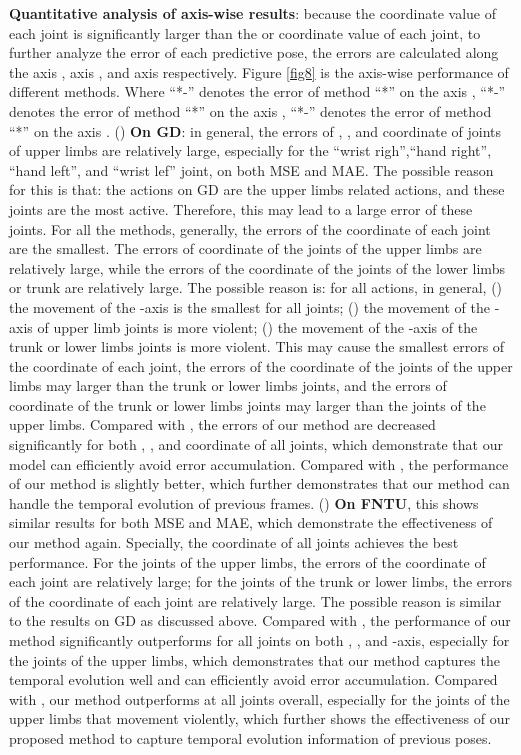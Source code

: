 \documentclass[journal]{IEEEtran}
\begin{document}
{\bf Quantitative analysis of axis-wise results}: because the  coordinate value of each joint is significantly larger than the  or  coordinate value of each joint, to further analyze the error of each predictive pose, the errors are calculated along the axis , axis , and axis  respectively. Figure \ref{fig8} is the axis-wise performance of different methods. Where ``*-'' denotes the error of method ``*'' on the axis , ``*-'' denotes the error of method ``*'' on the axis , ``*-'' denotes the error of method ``*'' on the axis . () {\bf On GD}: in general, the errors of , , and  coordinate of joints of upper limbs are relatively large, especially for the ``wrist righ'',``hand right'', ``hand left'', and ``wrist lef'' joint, on both MSE and MAE. The possible reason for this is that: the actions on GD are the upper limbs related actions, and these joints are the most active. Therefore, this may lead to a large error of these joints. For all the methods, generally, the errors of the  coordinate of each joint are the smallest. The errors of  coordinate of the joints of the upper limbs are relatively large, while the errors of the  coordinate of the joints of the lower limbs or trunk are relatively large. The possible reason is: for all actions, in general, () the movement of the -axis is the smallest for all joints; () the movement of the -axis of upper limb joints is more violent; () the movement of the -axis of the trunk or lower limbs joints is more violent. This may cause the smallest errors of the  coordinate of each joint, the errors of the  coordinate of the joints of the upper limbs may larger than the trunk or lower limbs joints, and the errors of  coordinate of the trunk or lower limbs joints may larger than the joints of the upper limbs. Compared with \cite{predcnn}, the errors of our method are decreased significantly for both , , and  coordinate of all joints, which demonstrate that our model can efficiently avoid error accumulation. Compared with \cite{ButepageDRL}, the performance of our method is slightly better, which further demonstrates that our method can handle the temporal evolution of previous frames. () {\bf On FNTU}, this shows similar results for both MSE and MAE, which demonstrate the effectiveness of our method again. Specially, the  coordinate of all joints achieves the best performance. For the joints of the upper limbs, the errors of the  coordinate of each joint are relatively large; for the joints of the trunk or lower limbs, the errors of the  coordinate of each joint are relatively large. The possible reason is similar to the results on GD as discussed above. Compared with \cite{predcnn}, the performance of our method significantly outperforms \cite{predcnn} for all joints on both , , and -axis, especially for the joints of the upper limbs, which demonstrates that our method captures the temporal evolution well and can efficiently avoid error accumulation. Compared with \cite{ButepageDRL}, our method outperforms \cite{ButepageDRL} at all joints overall, especially for the joints of the upper limbs that movement violently, which further shows the effectiveness of our proposed method to capture temporal evolution information of previous poses.
\end{document}
